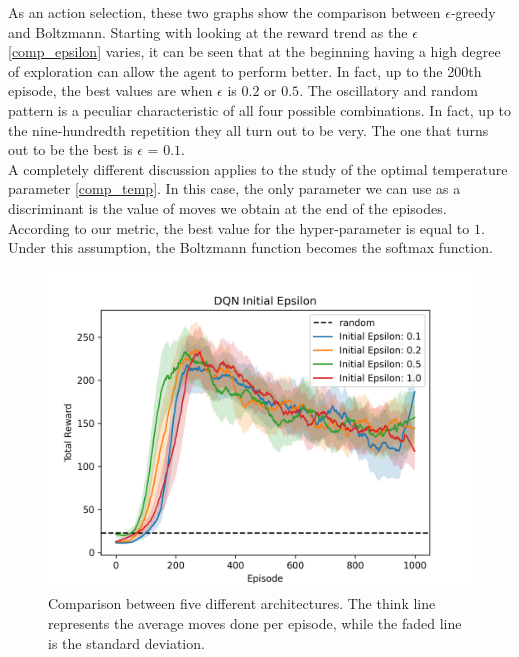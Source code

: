 \documentclass{article}
\begin{document}
   As an action selection, these two graphs show the comparison between $\epsilon$-greedy and Boltzmann. 
   Starting with looking at the reward trend as the $\epsilon$ \autoref{comp_epsilon} varies, 
   it can be seen that at the beginning having a high degree of exploration can allow the agent to perform better. 
   In fact, up to the 200th episode, the best values are when $\epsilon$ is $0.2$ or $0.5$.  
   The oscillatory and random pattern is a peculiar characteristic of all four possible combinations. 
   In fact, up to the nine-hundredth repetition they all turn out to be very. 
   The one that turns out to be the best is $\epsilon$ = $0.1$.\\
   A completely different discussion applies to the study of the optimal temperature parameter \autoref{comp_temp}. 
   In this case, the only parameter we can use as a discriminant is the value of moves we obtain at the end of the episodes. 
   According to our metric, the best value for the hyper-parameter is equal to $1$. Under this assumption, the Boltzmann function becomes the softmax function. 

   \begin{figure}[ht!]
      \centering
      \includegraphics[width=\columnwidth]{assets/fig_hp/epsilon.initial.png}
      \caption{Comparison between five different architectures. The think line represents the average moves done per episode, while the faded line is the standard deviation. 
      }
      \label{comp_epsilon}
   \end{figure}
\end{document}
